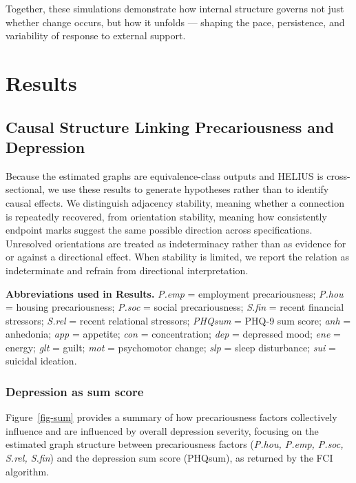 \documentclass[
]{article}
\begin{document}
Together, these simulations demonstrate how internal structure governs
not just whether change occurs, but how it unfolds --- shaping the pace,
persistence, and variability of response to external support.

\section{Results}\label{results}

\subsection{Causal Structure Linking Precariousness and
Depression}\label{causal-structure-linking-precariousness-and-depression}

\textcolor{BrickRed}{Because the estimated graphs are equivalence-class outputs and HELIUS is cross-sectional, we use these results to generate hypotheses rather than to identify causal effects. We distinguish adjacency stability, meaning whether a connection is repeatedly recovered, from orientation stability, meaning how consistently endpoint marks suggest the same possible direction across specifications. Unresolved orientations are treated as indeterminacy rather than as evidence for or against a directional effect. When stability is limited, we report the relation as indeterminate and refrain from directional interpretation.}

\begin{abbrbox}
\textbf{Abbreviations used in Results.}
\emph{P.emp} = employment precariousness; \emph{P.hou} = housing precariousness; \emph{P.soc} = social precariousness; \emph{S.fin} = recent financial stressors; \emph{S.rel} = recent relational stressors; \emph{PHQsum} = PHQ-9 sum score; \emph{anh} = anhedonia; \emph{app} = appetite; \emph{con} = concentration; \emph{dep} = depressed mood; \emph{ene} = energy; \emph{glt} = guilt; \emph{mot} = psychomotor change; \emph{slp} = sleep disturbance; \emph{sui} = suicidal ideation.
\end{abbrbox}

\subsubsection{Depression as sum score}\label{depression-as-sum-score}

Figure~\ref{fig-sum} provides a summary of how precariousness factors
collectively influence and are influenced by overall depression
severity,
\textcolor{BrickRed}{focusing on the estimated graph structure between precariousness factors (\textit{P.hou, P.emp, P.soc, S.rel, S.fin}) and the depression sum score (PHQsum), as returned by the FCI algorithm.}
\end{document}
